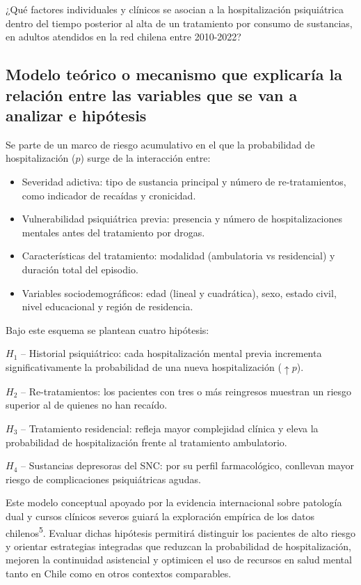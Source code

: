 \documentclass[
  spanish,
  10pt,
]{article}
\begin{document}
¿Qué factores individuales y clínicos se asocian a la hospitalización
psiquiátrica dentro del tiempo posterior al alta de un tratamiento por
consumo de sustancias, en adultos atendidos en la red chilena entre
2010-2022?

\subsection{Modelo teórico o mecanismo que explicaría la relación entre
las variables que se van a analizar e
hipótesis}\label{modelo-teuxf3rico-o-mecanismo-que-explicaruxeda-la-relaciuxf3n-entre-las-variables-que-se-van-a-analizar-e-hipuxf3tesis}

Se parte de un marco de riesgo acumulativo en el que la probabilidad de
hospitalización (\(p\)) surge de la interacción entre:

\begin{itemize}
\item
  Severidad adictiva: tipo de sustancia principal y número de
  re-tratamientos, como indicador de recaídas y cronicidad.
\item
  Vulnerabilidad psiquiátrica previa: presencia y número de
  hospitalizaciones mentales antes del tratamiento por drogas.
\item
  Características del tratamiento: modalidad (ambulatoria vs
  residencial) y duración total del episodio.
\item
  Variables sociodemográficos: edad (lineal y cuadrática), sexo, estado
  civil, nivel educacional y región de residencia.
\end{itemize}

Bajo este esquema se plantean cuatro hipótesis:

\(H_1\) -- Historial psiquiátrico: cada hospitalización mental previa
incrementa significativamente la probabilidad de una nueva
hospitalización (\(\uparrow p\)).

\(H_2\) -- Re-tratamientos: los pacientes con tres o más reingresos
muestran un riesgo superior al de quienes no han recaído.

\(H_3\) -- Tratamiento residencial: refleja mayor complejidad clínica y
eleva la probabilidad de hospitalización frente al tratamiento
ambulatorio.

\(H_4\) -- Sustancias depresoras del SNC: por su perfil farmacológico,
conllevan mayor riesgo de complicaciones psiquiátricas agudas.

Este modelo conceptual apoyado por la evidencia internacional sobre
patología dual y cursos clínicos severos guiará la exploración empírica
de los datos chilenos\textsuperscript{5}. Evaluar dichas hipótesis
permitirá distinguir los pacientes de alto riesgo y orientar estrategias
integradas que reduzcan la probabilidad de hospitalización, mejoren la
continuidad asistencial y optimicen el uso de recursos en salud mental
tanto en Chile como en otros contextos comparables.
\end{document}
